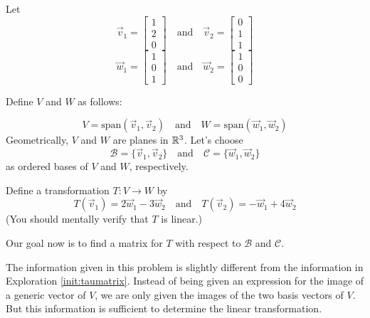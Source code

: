 \documentclass{ximera}
\begin{document}
\begin{exploration}\label{init:matlintransgeneral}
Let
$$\vec{v}_1=\begin{bmatrix}1\\2\\0\end{bmatrix}\quad\text{and}\quad\vec{v}_2=\begin{bmatrix}0\\1\\1\end{bmatrix}$$
$$\vec{w}_1=\begin{bmatrix}1\\0\\1\end{bmatrix}\quad\text{and}\quad\vec{w}_2=\begin{bmatrix}1\\0\\0\end{bmatrix}$$

Define $V$ and $W$ as follows:

$$V=\text{span}(\vec{v}_1, \vec{v}_2)\quad\text{and}\quad W=\text{span}(\vec{w}_1, \vec{w}_2)$$
Geometrically, $V$ and $W$ are planes in $\mathbb{R}^3$.
Let's choose
$$\mathcal{B}=\{\vec{v}_1, \vec{v}_2\}\quad\text{and}\quad\mathcal{C}=\{\vec{w}_1, \vec{w}_2\}$$
as ordered bases of $V$ and $W$, respectively.

Define a transformation $T:V\rightarrow W$ by 
$$T(\vec{v}_1)=2\vec{w}_1-3\vec{w}_2\quad\text{and} \quad T(\vec{v}_2)=-\vec{w}_1+4\vec{w}_2$$
(You should mentally verify that $T$ is linear.)

Our goal now is to find a matrix for $T$ with respect to $\mathcal{B}$ and $\mathcal{C}$.  

The information given in this problem is slightly different from the information in Exploration \ref{init:taumatrix}.  Instead of being given an expression for the image of a generic vector of $V$, we are only given the images of the two basis vectors of $V$.  But this information is sufficient to determine the linear transformation.


\end{exploration}
\end{document}
